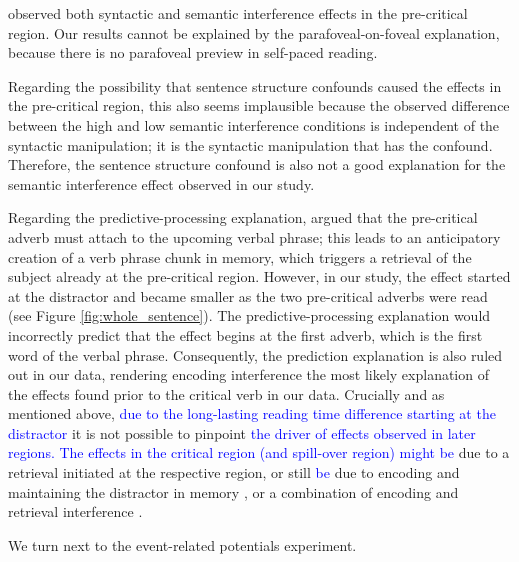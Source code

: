 \documentclass[review,preprint,12pt,authoryear,floatsintext]{elsarticle}
\begin{document}
\cite{mertzen} observed both syntactic and semantic interference effects in the pre-critical region. {}\label{confound} Our results cannot be explained by the parafoveal-on-foveal explanation, because there is no parafoveal preview in self-paced reading. 

Regarding the possibility that sentence structure confounds caused the effects in the pre-critical region, this also seems implausible because the observed difference between the high and low semantic interference conditions is independent of the syntactic manipulation; it is the syntactic manipulation that has the confound. Therefore, the sentence structure confound is also not a good explanation for the semantic interference effect observed in our study. 

Regarding the predictive-processing explanation, \citet{mertzen} argued that the pre-critical adverb must attach to the upcoming verbal phrase; this leads to an anticipatory creation of a verb phrase chunk in memory, which triggers a retrieval of the subject already at the pre-critical region. However, in our study, the effect started at the distractor and became smaller as the two pre-critical adverbs were read (see Figure \ref{fig:whole_sentence}). The predictive-processing explanation would incorrectly predict that the effect begins at the first adverb, which is the first word of the verbal phrase. Consequently, the prediction explanation is also ruled out in our data, rendering encoding interference the most likely explanation of the effects found prior to the critical verb in our data. Crucially and as mentioned above, \textcolor{blue}{due to the long-lasting reading time difference starting at the distractor} it is not possible to pinpoint \textcolor{blue}{the driver of effects observed in later regions. The effects in the critical region (and spill-over region) might be} due to a retrieval initiated at the respective region, or still \textcolor{blue}{be} due to encoding and maintaining the distractor in memory \citep{ness2017}, or a combination of encoding and retrieval interference \citep{Yadavetal2022}.

We turn next to the event-related potentials experiment.
\end{document}

